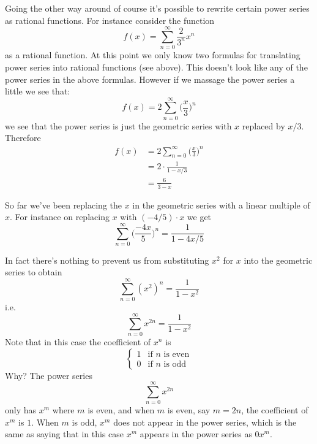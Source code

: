 \newpage
\newpage
\newpage

\newpage
Going the other way around of course it's possible to 
rewrite certain power series as rational functions.
For instance consider the function
\[
  f(x) = \sum_{n=0}^\infty \frac{2}{3^n} x^n
\]
as a rational function.
At this point we only know two formulas for translating
power series into rational functions (see above).
This doesn't look like any of the power series
in the above formulas.
However if we massage the power series a little we see that:
\[
  f(x) = 2 \sum_{n=0}^\infty \biggl( \frac{x}{3} \biggr)^n
\]
we see that the power series is just the geometric series with
$x$ replaced by $x/3$.
Therefore
\begin{align*}
  f(x) 
  &= 2 \sum_{n=0}^\infty \biggl( \frac{x}{3} \biggr)^n \\
  &= 2 \cdot \frac{1}{1 - x/3} \\
  &= \frac{6}{3 - x}
\end{align*}

\newpage
\newpage
\newpage
\newpage
\newpage
\newpage

\newpage
So far we've been replacing the $x$ in the geometric series with
a linear multiple of $x$.
For instance on replacing $x$ with $(-4/5) \cdot x$ we get
\[
  \sum_{n=0}^\infty \biggl( \frac{-4x}{5} \biggr)^n = \frac{1}{1 - 4x/5}
\]

In fact there's nothing to prevent us from substituting $x^2$ for $x$ into
the geometric series to obtain
\[
  \sum_{n=0}^\infty (x^2)^n = \frac{1}{1 - x^2}
\]
i.e.
\[
  \sum_{n=0}^\infty x^{2n} = \frac{1}{1 - x^2}
\]
Note that in this case the coefficient of $x^n$ is
\[
  \begin{cases}
    1 & \text{if $n$ is even} \\
    0 & \text{if $n$ is odd} 
  \end{cases}
\]
Why?
The power series
\[
  \sum_{n=0}^\infty x^{2n}
\]
only has $x^m$ where $m$ is even, and when $m$ is even, say $m = 2n$,
the coefficient of $x^m$ is $1$.
When $m$ is odd, $x^m$ does not appear in the power series,
which is the same as saying that in this case $x^m$ appears in the
power series as $0x^m$.

